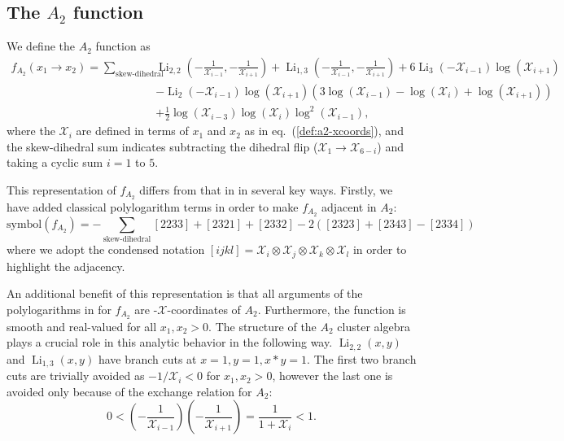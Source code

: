 \documentclass[11pt]{article}
\DeclareMathOperator{\Li}{Li}
\def\x{\mathcal{X}}
\def\xcoords{$\mathcal{X}$-coordinates }
\def\pdfeq#1{\texorpdfstring{$#1$}{a}}
\begin{document}
\subsection{The \pdfeq{A_2} function}
We define the $A_2$ function as
\begin{equation}\label{def:a2-function}
\begin{split}
	f_{A_2}(x_1 \to x_2)  = \sum_{\text{skew-dihedral}} &\Li_{2,2}\left(-\frac{1}{\x_{i-1}},-\frac{1}{\x_{i+1}}\right) + \Li_{1,3}\left(-\frac{1}{\x_{i-1}},-\frac{1}{\x_{i+1}}\right)+6 \Li_3\left(-\x_{i-1}\right) \log \left(\x_{i+1}\right)
	\\&-\Li_2\left(-\x_{i-1}\right) \log \left(\x_{i+1}\right) \left(3 \log \left(\x_{i-1}\right)-\log \left(\x_i\right)+\log \left(\x_{i+1}\right)\right)
	\\&+\frac{1}{2} \log \left(\x_{i-3}\right) \log \left(\x_i\right) \log ^2\left(\x_{i-1}\right),
\end{split}
\end{equation}
where the $\x_i$ are defined in terms of $x_1$ and $x_2$ as in eq.~(\ref{def:a2-xcoords}), and the skew-dihedral sum indicates subtracting the dihedral flip ($\x_1 \to \x_{6-i}$) and taking a cyclic sum $i=1$ to $5$.

This representation of $f_{A_2}$ differs from that in \cite{Golden:2014xqa} in several key ways. Firstly, we have added classical polylogarithm terms in order to make $f_{A_2}$ adjacent in $A_2$:
\begin{equation}
   \text{symbol}(f_{A_2}) = -\sum_{\text{skew-dihedral}}[2233]+[2321]+[2332]-2([2323]+[2343]-[2334])
\end{equation}
where we adopt the condensed notation $[ijkl] = \x_i\otimes\x_j\otimes\x_k\otimes\x_l$ in order to highlight the adjacency. 

An additional benefit of this representation is that all arguments of the polylogarithms in for $f_{A_2}$ are -\xcoords of $A_2$. Furthermore, the function is smooth and real-valued for all $x_1, x_2>0$. The structure of the $A_2$ cluster algebra plays a crucial role in this analytic behavior in the following way. $\Li_{2,2}(x,y)$ and $\Li_{1,3}(x,y)$ have branch cuts at $x=1,y=1, x*y=1$. The first two branch cuts are trivially avoided as $-1/\x_i<0$ for $x_1,x_2>0$, however the last one is avoided only because of the exchange relation for $A_2$: 
\begin{equation}
	0<\left(-\frac{1}{\x_{i-1}}\right)\left(-\frac{1}{\x_{i+1}}\right) = \frac{1}{1+\x_i}<1.
\end{equation}
\end{document}
